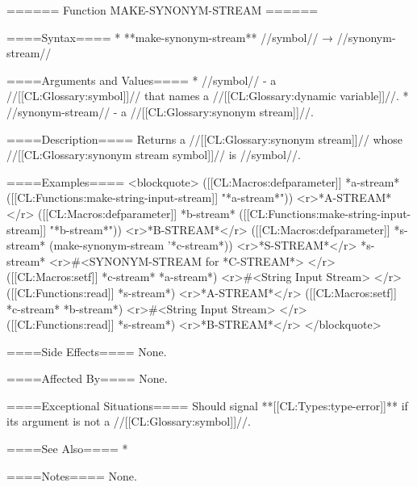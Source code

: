 ====== Function MAKE-SYNONYM-STREAM ======

====Syntax====
  * **make-synonym-stream** //symbol// → //synonym-stream//

====Arguments and Values====
  * //symbol// - a //[[CL:Glossary:symbol]]// that names a //[[CL:Glossary:dynamic variable]]//.
  * //synonym-stream// - a //[[CL:Glossary:synonym stream]]//.

====Description====
Returns a //[[CL:Glossary:synonym stream]]// whose //[[CL:Glossary:synonym stream symbol]]// is //symbol//.

====Examples====
<blockquote> 
([[CL:Macros:defparameter]] *a-stream* ([[CL:Functions:make-string-input-stream]] "*a-stream*")) <r>*A-STREAM* </r>
([[CL:Macros:defparameter]] *b-stream* ([[CL:Functions:make-string-input-stream]] "*b-stream*")) <r>*B-STREAM*</r>
([[CL:Macros:defparameter]] *s-stream* (make-synonym-stream '*c-stream*)) <r>*S-STREAM*</r>
*s-stream* <r>#<SYNONYM-STREAM for *C-STREAM*> </r>
([[CL:Macros:setf]] *c-stream* *a-stream*) <r>#<String Input Stream> </r>
([[CL:Functions:read]] *s-stream*) <r>*A-STREAM*</r>
([[CL:Macros:setf]] *c-stream* *b-stream*) <r>#<String Input Stream> </r>
([[CL:Functions:read]] *s-stream*) <r>*B-STREAM*</r>
</blockquote>

====Side Effects====
None.

====Affected By====
None.

====Exceptional Situations====
Should signal **[[CL:Types:type-error]]** if its argument is not a //[[CL:Glossary:symbol]]//.

====See Also====
  * {\secref\StreamConcepts}

====Notes====
None.

